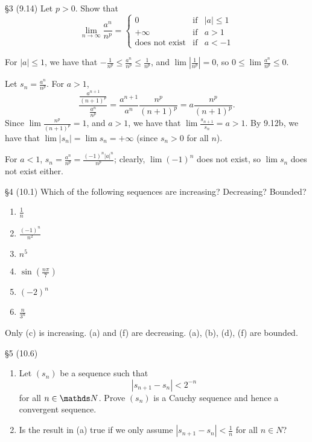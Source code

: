 \documentclass{homework}
\begin{document}
\begin{problem}{\S 3}
  (9.14) Let $p>0$. Show that \[
    \lim\limits_{n \to \infty} \frac{a^{n}}{n^{p}}=\left\{\begin{array}{rcl}  
        0 & \mbox{if} & \left| a \right| \le 1\\
        +\infty & \mbox{if} & a > 1\\
        \text{does not exist} & \mbox{if} & a<-1
      \end{array}\right.
    \] 
\end{problem}

\begin{solution}
  For $\left| a \right| \le 1$, we have that $-\frac{1}{n^{p}}\le \frac{a^{n}}{n^{p}}\le
  \frac{1}{n^{p}}$, and $\lim{\left| \frac{1}{n^{p}} \right| }=0$, so $0\le
  \lim{\frac{a^{n}}{n^{p}}}\le 0$.

  Let $s_n=\frac{a^n}{n^p}$. For $a>1$, \[
    \frac{\frac{a^{n+1}}{(n+1)^{p}}}{\frac{a^n}{n^p}}=\frac{a^{n+1}}{a^{n}}\frac{n^{p}}{(n+1)^{p}}=a
    \frac{n^{p}}{(n+1)^{p}}
  .\] Since $\lim{\frac{n^p}{(n+1)^p}}=1$, and $a>1$, we have that $\lim{\frac{s_{n+1}}{s_n}}=a>1$.
  By 9.12b, we have that $\lim{\left| s_n \right| }=\lim{s_n}=+\infty$ (since $s_n>0$ for all $n$).

  For $a<1$, $s_n=\frac{a^n}{n^p}=\frac{(-1)^n\left| a \right| ^n}{n^p}$; clearly, $\lim{(-1)^n}$
  does not exist, so $\lim{s_n}$ does not exist either.
\end{solution}

\begin{problem}{\S 4}
  (10.1) Which of the following sequences are increasing? Decreasing? Bounded?
  \begin{enumerate}[label=(\alph*)]
    \item $\frac{1}{n}$ 
    \item $\frac{(-1)^n}{n^2}$
    \item $n^{5}$
    \item $\sin{(\frac{n\pi}{7})}$ 
    \item $(-2)^{n}$
    \item $\frac{n}{3^{n}}$
  \end{enumerate}
\end{problem}

\begin{solution}
  Only (c) is increasing. (a) and (f) are decreasing. (a), (b), (d), (f) are bounded.
\end{solution}

\begin{problem}{\S 5}
  (10.6)
  \begin{enumerate}[label=(\alph*)]
    \item Let $(s_n)$ be a sequence such that  \[
        \left| s_{n+1}-s_n \right| < 2^{-n}
      \] for all $n\in \N$. Prove $(s_n)$ is a Cauchy sequence and hence a convergent sequence.
    \item Is the result in (a) true if we only assume  $\left| s_{n+1}-s_n \right| <\frac{1}{n}$ for
      all $n\in N$?
  \end{enumerate}
\end{problem}
\end{document}
